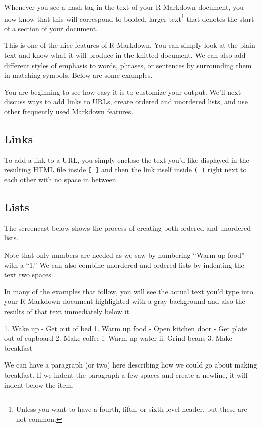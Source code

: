 \documentclass[]{tufte-book}
\newenvironment{Shaded}{\begin{snugshade}}{\end{snugshade}}
\newcommand{\NormalTok}[1]{#1}
\newcommand{\StringTok}[1]{\textcolor[rgb]{0.31,0.60,0.02}{#1}}
\begin{document}
Whenever you see a hash-tag in the text of your R Markdown document, you now know that this will correspond to bolded, larger text\footnote{Unless you want to have a fourth, fifth, or sixth level header, but these are not common.} that denotes the start of a section of your document.

This is one of the nice features of R Markdown. You can simply look at the plain text and know what it will produce in the knitted document. We can also add different styles of emphasis to words, phrases, or sentences by surrounding them in matching symbols. Below are some examples.

You are beginning to see how easy it is to customize your output. We'll next discuss ways to add links to URLs, create ordered and unordered lists, and use other frequently used Markdown features.

\hypertarget{links}{%
\subsection{Links}\label{links}}

To add a link to a URL, you simply enclose the text you'd like displayed in the resulting HTML file inside \texttt{{[}\ {]}} and then the link itself inside \texttt{(\ )} right next to each other with no space in between.

\hypertarget{lists}{%
\subsection{Lists}\label{lists}}

The screencast below shows the process of creating both ordered and unordered lists.

Note that only numbers are needed as we saw by numbering ``Warm up food'' with a ``1.'' We can also combine unordered and ordered lists by indenting the text two spaces.

In many of the examples that follow, you will see the actual text you'd type into your R Markdown document highlighted with a gray background and also the results of that text immediately below it.

\begin{Shaded}
\begin{Highlighting}[]
\StringTok{1. Wake up}
\StringTok{  {-} Get out of bed}
\StringTok{1. Warm up food}
\StringTok{  {-} Open kitchen door}
\StringTok{  {-} Get plate out of cupboard}
\StringTok{2. Make coffee}
\StringTok{  i. Warm up water}
\StringTok{  ii. Grind beans}
\StringTok{3. Make breakfast}

\NormalTok{  We can have a paragraph (or two) here describing how we could go about making}
\NormalTok{  breakfast. If we indent the paragraph a few spaces and create a newline, it}
\NormalTok{  will indent below the item.}
\end{Highlighting}
\end{Shaded}
\end{document}
